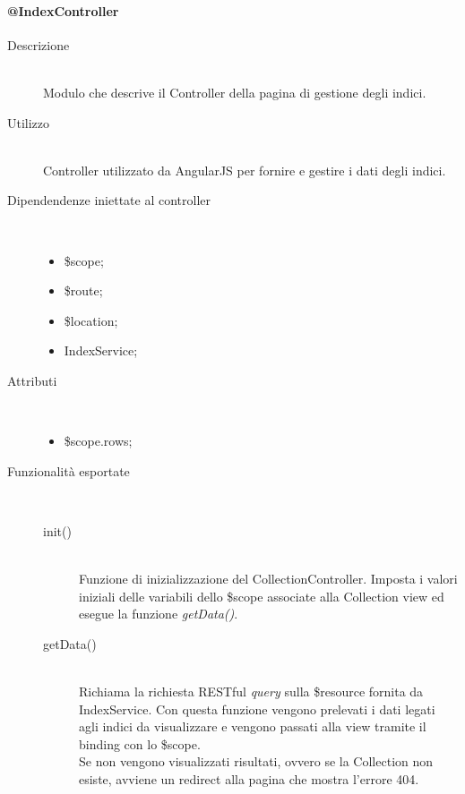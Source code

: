 \paragraph{@IndexController}
\begin{description}
 \item[Descrizione] \hfill \\
 Modulo che descrive il Controller della pagina di gestione degli indici.
 
 \item[Utilizzo] \hfill \\
 Controller utilizzato da AngularJS per fornire e gestire i dati degli indici.

 
 \item[Dipendendenze iniettate al controller] \hfill \\
 \begin{itemize}
  \item \$scope;
  \item \$route;
  \item \$location;
  \item IndexService;
 \end{itemize}
 
 \item[Attributi] \hfill \\
 \begin{itemize}
 \item \$scope.rows;
 \end{itemize}
 
 \item[Funzionalità esportate] \hfill \\
 \begin{description}
  \item[init()] \hfill \\
  Funzione di inizializzazione del CollectionController. Imposta i valori iniziali delle variabili dello
  \$scope associate alla Collection view ed esegue la funzione \emph{getData()}.
  
  \item[getData()] \hfill \\
  Richiama la richiesta RESTful \textit{query} sulla \$resource fornita da IndexService.
  Con questa funzione vengono prelevati i dati legati agli indici da visualizzare e vengono
  passati alla  view tramite il binding con lo \$scope. \\
  Se non vengono visualizzati risultati, ovvero se la Collection non esiste, avviene un redirect alla pagina
  che mostra l'errore 404.
  

\end{description}
\end{description}
